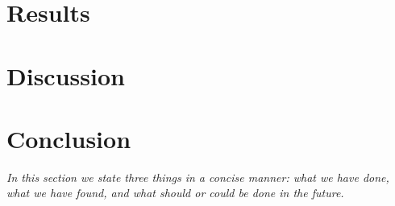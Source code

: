 \documentclass[english,notitlepage,reprint,nofootinbib]{revtex4-1}  %
\begin{document}
\section{Results}\label{sec:results}
%

\section{Discussion}\label{sec:discussion}
%




\section{Conclusion}\label{sec:conclusion}
\textit{In this section we state three things in a concise manner: what we have done, what we have found, and what should or could be done in the future.}


\onecolumngrid

%

\end{document}
